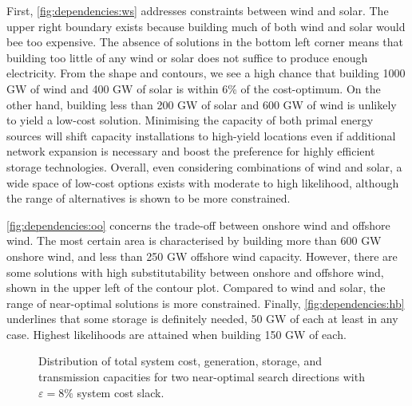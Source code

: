 First, \cref{fig:dependencies:ws} addresses constraints between wind and solar.
The upper right boundary exists because building much of both wind and solar would bee too expensive.
The absence of solutions in the bottom left corner means that
building too little of any wind or solar does not suffice to produce enough electricity.
From the shape and contours, we see a high chance
that building 1000 GW of wind and 400 GW of solar is within 6\% of the cost-optimum.
On the other hand, building less than 200 GW of solar and 600 GW of wind is unlikely to yield a low-cost solution.
Minimising the capacity of both primal energy sources will shift capacity installations to
high-yield locations even if additional network expansion is necessary and boost
the preference for highly efficient storage technologies.
Overall, even considering combinations of wind and solar,
a wide space of low-cost options exists with moderate to high likelihood,
although the range of alternatives is shown to be more constrained.

\cref{fig:dependencies:oo} concerns the trade-off between onshore wind and offshore wind.
The most certain area is characterised by building more than 600 GW onshore wind,
and less than 250 GW offshore wind capacity.
However, there are some solutions with high substitutability between onshore and offshore wind,
shown in the upper left of the contour plot.
Compared to wind and solar, the range of near-optimal solutions is more constrained.
Finally, \cref{fig:dependencies:hb} underlines that some storage is definitely needed,
50 GW of each at least in any case. Highest likelihoods are attained when building 150 GW of each.

\begin{figure}
    \noindent{}
    \caption{
      Distribution of total system cost, generation, storage, and transmission capacities
      for two near-optimal search directions with $\varepsilon=8\%$ system cost slack.
    }
    \label{fig:nearviolin}
\end{figure}

